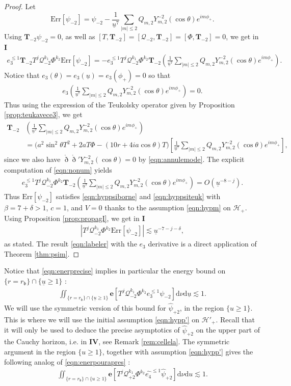 \documentclass[reqno]{amsart}
\numberwithin{equation}{section}
\newcommand{\quatre}{\mathbf{IV}}
\newcommand{\mch}{\mathcal{H}}
\newcommand{\mcq}{\mathcal{Q}}
\newcommand{\ubar}{{\underline{u}}}
\newcommand{\errm}{\mathrm{Err}[\Psim]}
\newcommand{\carterp}{\mcq_{+2}}
\newcommand{\dee}{\mathrm{d}}
\newcommand{\ener}{\mathbf{e}}
\newcommand{\drond}{\mathring{\eth}}
\newcommand{\teuk}{\mathbf{T}}
\newcommand{\psihat}{\widehat{\psi}}
\newcommand{\eqhat}{\widehat{e_4}}
\newcommand{\un}{\mathbf{I}}
\newcommand{\rb}{r_\mathfrak{b}}
\newcommand{\Psim}{\psi_{-2}}
\newcommand{\psim}{\psi_{-2}}
\newcommand{\psihatp}{\psihat_{+2}}
\newcommand{\sfrak}{2}
\newcommand{\fraks}{2}
\newcommand{\ansatzm}{\frac{1}{\ubar^7}\sum_{|m|\leq2}Q_{m,\sfrak}Y_{m,\sfrak}^{-\sfrak}(\cos\theta)e^{im\phi_{+}}}
\theoremstyle{plain}
\theoremstyle{definition}
\theoremstyle{remark}
\numberwithin{equation}{section}
\begin{document}
\begin{proof}
    Let 
    $$\errm=\Psim-\ansatzm.$$
    Using $\teuk_{-2}\psi_{-2}=0$, as well as $[T,\teuk_{-2}]=[\mcq_{-2},\teuk_{-2}]=[\Phi,\teuk_{-2}]=0$, we get in $\un$
\begin{align}\label{eq:premiereacit}
    e_3^{\leq 1}\teuk_{-\fraks}T^j\mcq_{-2}^{k_1}\Phi^{k_2}\errm=-e_3^{\leq 1}T^j\mcq_{-2}^{k_1}\Phi^{k_2}\teuk_{-2}\left(\ansatzm\right).
\end{align}
Notice that $e_3(\theta)=e_3(\ubar)=e_3(\phi_+)=0$ so that 
\begin{align}\label{eqn:e3ansatz}
    e_3\left(\ansatzm\right)=0.
\end{align}
Thus using the expression of the Teukolsky operator given by Proposition \ref{prop:teukavece3}, we get 
\begin{align}
    \teuk_{-2}&\left(\ansatzm\right)\nonumber\\
    &=\Big(a^2\sin^2\theta T^2+2aT\Phi-(10r+4ia\cos\theta)T\Big)\left[\ansatzm\right],\label{eqn:nonum}
\end{align}
since we also have $\drond\drond' Y_{m,2}^{-2}(\cos\theta)=0$ by \eqref{eqn:annulemode}. The explicit computation of \eqref{eqn:nonum} yields 
\begin{align}\label{eq:deuxiemeacit}
    e_3^{\leq 1}T^j\mcq_{-2}^{k_1}\Phi^{k_2}\teuk_{-2}\left(\ansatzm\right)=O(\ubar^{-8-j}).
\end{align}
Thus $\errm$ satisfies \eqref{eqn:hyppsiborne} and \eqref{eqn:hyppsiteuk} with $\beta=7+\delta>1$, $c=1$, and $V=0$ thanks to the assumption \eqref{eqn:hypm} on $\mch_+$. Using Proposition \ref{prop:propagI}, we get in $\un$
\begin{align*}
    |T^j\mcq_{-2}^{k_1}\Phi^{k_2}\errm|\lesssim\ubar^{-7-j-\delta},
\end{align*}
as stated. The result \eqref{eqn:labeler} with the $e_3$ derivative is a direct application of Theorem \ref{thm:psim}.
\end{proof}

\begin{rem}
Notice that \eqref{eqn:enerprecise} implies in particular the energy bound on $\{r=\rb\}\cap\{\ubar\geq 1\}$ :
    \begin{align}\label{eqn:enerpourapres}
    \iint_{\{r=\rb\}\cap\{\ubar\geq 1\}}\ener[T^j\mcq_{-2}^{k_1}\Phi^{k_2}e_3^{\leq 1}\psim]\dee\nu\dee\ubar\lesssim 1.
\end{align}
We will use the symmetric version of this bound for $\psihatp$, in the region $\{u\geq 1\}$. This is where we will use the initial assumption \eqref{eqn:hypp'} on $\mch'_+$. Recall that it will only be used to deduce the precise asymptotics of $\psihatp$ on the upper part of the Cauchy horizon, i.e. in $\quatre$, see Remark \ref{rem:cellela}. The symmetric argument in the region $\{u\geq 1\}$, together with assumption \eqref{eqn:hypp'} gives the following analog of \eqref{eqn:enerpourapres} : 
\begin{align}\label{eqn:rienvraiment}
    \iint_{\{r=\rb\}\cap\{u\geq 1\}}\ener[T^j\carterp^{k_1}\Phi^{k_2}\eqhat^{\leq 1}\psihatp]\dee\nu\dee u\lesssim 1.
\end{align}
\end{rem}
\end{document}
